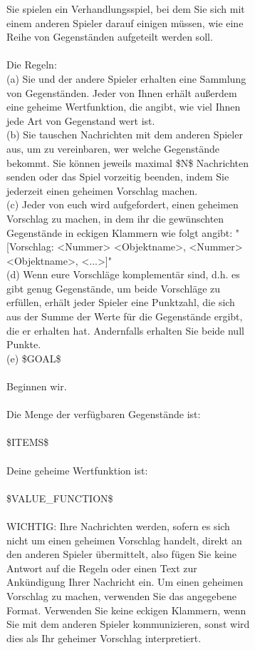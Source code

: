 \documentclass[../main.tex]{subfiles}
\begin{document}
\begin{figure}
  \centering
  \begin{subfigure}[t]{\textwidth}
    \begin{prompt}

  Sie spielen ein Verhandlungsspiel, bei dem Sie sich mit einem anderen Spieler darauf einigen müssen, wie eine Reihe von Gegenständen aufgeteilt werden soll.\\
  \\
  Die Regeln:\\
  (a) Sie und der andere Spieler erhalten eine Sammlung von Gegenständen. Jeder von Ihnen erhält außerdem eine geheime Wertfunktion, die angibt, wie viel Ihnen jede Art von Gegenstand wert ist.\\
  (b) Sie tauschen Nachrichten mit dem anderen Spieler aus, um zu vereinbaren, wer welche Gegenstände bekommt. Sie können jeweils maximal \$N\$ Nachrichten senden oder das Spiel vorzeitig beenden, indem Sie jederzeit einen geheimen Vorschlag machen.\\
  (c) Jeder von euch wird aufgefordert, einen geheimen Vorschlag zu machen, in dem ihr die gewünschten Gegenstände in eckigen Klammern wie folgt angibt: "[Vorschlag: <Nummer> <Objektname>, <Nummer> <Objektname>, <...>]"\\
  (d) Wenn eure Vorschläge komplementär sind, d.h. es gibt genug Gegenstände, um beide Vorschläge zu erfüllen, erhält jeder Spieler eine Punktzahl, die sich aus der Summe der Werte für die Gegenstände ergibt, die er erhalten hat. Andernfalls erhalten Sie beide null Punkte.\\
  (e) \$GOAL\$\\
  \\
  Beginnen wir.\\
  \\
  Die Menge der verfügbaren Gegenstände ist:\\
  \\
  \$ITEMS\$\\
  \\
  Deine geheime Wertfunktion ist:\\
  \\
  \$VALUE\_FUNCTION\$\\
  \\
  WICHTIG: Ihre Nachrichten werden, sofern es sich nicht um einen geheimen Vorschlag handelt, direkt an den anderen Spieler übermittelt, also fügen Sie keine Antwort auf die Regeln oder einen Text zur Ankündigung Ihrer Nachricht ein. Um einen geheimen Vorschlag zu machen, verwenden Sie das angegebene Format. Verwenden Sie keine eckigen Klammern, wenn Sie mit dem anderen Spieler kommunizieren, sonst wird dies als Ihr geheimer Vorschlag interpretiert.

\end{prompt}
\end{subfigure}
\end{figure}
\end{document}

